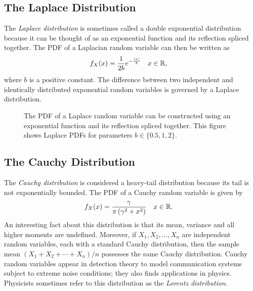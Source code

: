 \subsection{The Laplace Distribution}

The \emph{Laplace distribution} is sometimes called a double exponential distribution because it can be thought of as an exponential function and its reflection spliced together. 
The PDF of a Laplacian random variable can then be written as
\begin{equation*}
f_X (x) = \frac{1}{2b} e^{- \frac{|x|}{b}} \quad x \in \mathbb{R} ,
\end{equation*}
where $b$ is a positive constant.
The difference between two independent and identically distributed exponential random variables is governed by a Laplace distribution.

\begin{figure}[ht]
\begin{center}
\end{center}
\caption{The PDF of a Laplace random variable can be constructed using an exponential function and its reflection spliced together.
This figure shows Laplace PDFs for parameters $b \in \{0.5, 1, 2 \}$.}
\end{figure}


\subsection{The Cauchy Distribution}

The \emph{Cauchy distribution} is considered a heavy-tail distribution because its tail is not exponentially bounded. 
The PDF of a Cauchy random variable is given by
\begin{equation*}
f_X (x) = \frac{ \gamma }{\pi \left( \gamma^2 + x^2 \right)} \quad x \in \mathbb{R} .
\end{equation*}
An interesting fact about this distribution is that its mean, variance and all higher moments are undefined.
Moreover, if $X_1, X_2, \ldots, X_n$ are independent random variables, each with a standard Cauchy distribution, then the sample mean $(X_1 + X_2 + \cdots + X_n)/n$ possesses the same Cauchy distribution.
Cauchy random variables appear in detection theory to model communication systems subject to extreme noise conditions; they also finds applications in physics.
Physicists sometimes refer to this distribution as the \emph{Lorentz distribution}.

